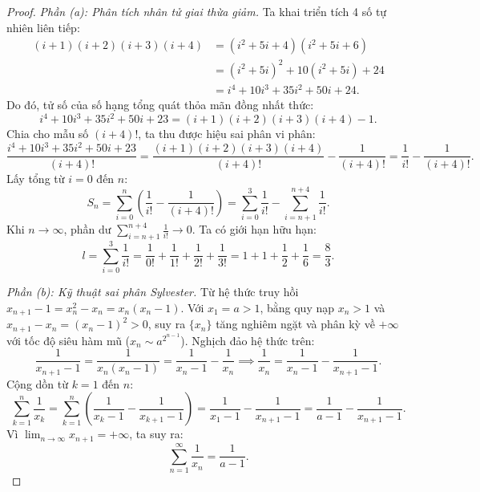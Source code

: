 \documentclass{article}
\begin{document}
\begin{proof}
\emph{Phần (a): Phân tích nhân tử giai thừa giảm.}
Ta khai triển tích 4 số tự nhiên liên tiếp:
\begin{align}
    (i + 1)(i + 2)(i + 3)(i + 4) &= (i^2 + 5i + 4)(i^2 + 5i + 6) \nonumber \\
    &= (i^2 + 5i)^2 + 10(i^2 + 5i) + 24 \nonumber \\
    &= i^4 + 10i^3 + 35i^2 + 50i + 24.
\end{align}
Do đó, tử số của số hạng tổng quát thỏa mãn đồng nhất thức:
\begin{equation}
    i^4 + 10i^3 + 35i^2 + 50i + 23 = (i + 1)(i + 2)(i + 3)(i + 4) - 1.
\end{equation}
Chia cho mẫu số $(i + 4)!$, ta thu được hiệu sai phân vi phân:
\begin{equation}
    \frac{i^4 + 10i^3 + 35i^2 + 50i + 23}{(i + 4)!} = \frac{(i + 1)(i + 2)(i + 3)(i + 4)}{(i + 4)!} - \frac{1}{(i + 4)!} = \frac{1}{i!} - \frac{1}{(i + 4)!}.
\end{equation}
Lấy tổng từ $i = 0$ đến $n$:
\begin{equation}
    S_n = \sum_{i=0}^n \left(\frac{1}{i!} - \frac{1}{(i + 4)!}\right) = \sum_{i=0}^3 \frac{1}{i!} - \sum_{i=n+1}^{n+4} \frac{1}{i!}.
\end{equation}
Khi $n \to \infty$, phần dư $\sum_{i=n+1}^{n+4} \frac{1}{i!} \to 0$. Ta có giới hạn hữu hạn:
\begin{equation}
    l = \sum_{i=0}^3 \frac{1}{i!} = \frac{1}{0!} + \frac{1}{1!} + \frac{1}{2!} + \frac{1}{3!} = 1 + 1 + \frac{1}{2} + \frac{1}{6} = \frac{8}{3}.
\end{equation}

\emph{Phần (b): Kỹ thuật sai phân Sylvester.}
Từ hệ thức truy hồi $x_{n+1} - 1 = x_n^2 - x_n = x_n(x_n - 1)$.
Với $x_1 = a > 1$, bằng quy nạp $x_n > 1$ và $x_{n+1} - x_n = (x_n - 1)^2 > 0$, suy ra $\{x_n\}$ tăng nghiêm ngặt và phân kỳ về $+\infty$ với tốc độ siêu hàm mũ ($x_n \sim a^{2^{n-1}}$).
Nghịch đảo hệ thức trên:
\begin{equation}
    \frac{1}{x_{n+1} - 1} = \frac{1}{x_n(x_n - 1)} = \frac{1}{x_n - 1} - \frac{1}{x_n} \implies \frac{1}{x_n} = \frac{1}{x_n - 1} - \frac{1}{x_{n+1} - 1}.
\end{equation}
Cộng dồn từ $k = 1$ đến $n$:
\begin{equation}
    \sum_{k=1}^n \frac{1}{x_k} = \sum_{k=1}^n \left(\frac{1}{x_k - 1} - \frac{1}{x_{k+1} - 1}\right) = \frac{1}{x_1 - 1} - \frac{1}{x_{n+1} - 1} = \frac{1}{a - 1} - \frac{1}{x_{n+1} - 1}.
\end{equation}
Vì $\lim_{n\to\infty} x_{n+1} = +\infty$, ta suy ra:
\begin{equation}
    \sum_{n=1}^\infty \frac{1}{x_n} = \frac{1}{a - 1}.
\end{equation}
\end{proof}
\end{document}
